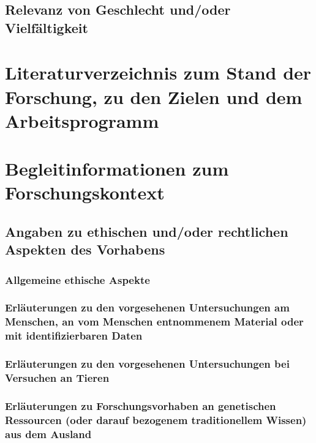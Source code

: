 \documentclass[de]{dfg-proposal}
\begin{document}
        \subsection{Relevanz von Geschlecht und/oder Vielfältigkeit}


    \section{Literaturverzeichnis zum Stand der Forschung, zu den Zielen und dem Arbeitsprogramm}\label{sec:literaturverzeichnis}

        \printbibliography

        \partbreak


    \section{Begleitinformationen zum Forschungskontext}\label{sec:begleitinformationen-zum-forschungskontext}

        \subsection{Angaben zu ethischen und/oder rechtlichen Aspekten des Vorhabens}

            \subsubsection{Allgemeine ethische Aspekte}

            \subsubsection{Erläuterungen zu den vorgesehenen Untersuchungen am Menschen, an vom Menschen entnommenem Material oder mit identifizierbaren Daten}

            \subsubsection{Erläuterungen zu den vorgesehenen Untersuchungen bei Versuchen an Tieren}

            \subsubsection{Erläuterungen zu Forschungsvorhaben an genetischen Ressourcen (oder darauf bezogenem traditionellem Wissen) aus dem Ausland}
\end{document}

